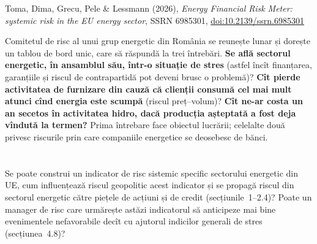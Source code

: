 
\renewcommand{\emqacase}{\T{Research case 4 (Lecture 4)}{Studiul de caz 4 (cursul 4)}}

%
          { Toma, Dima, Grecu, Pele \& Lessmann (2026), \emph{Energy Financial Risk Meter: systemic risk in the EU energy sector},
           SSRN 6985301, \href{https://doi.org/10.2139/ssrn.6985301}{doi:10.2139/ssrn.6985301}}

\begin{scenario}
%
{Comitetul de risc al unui grup energetic din România se reunește lunar și dorește un tablou de bord unic, care să răspundă la trei întrebări.
\textbf{Se află sectorul energetic, în ansamblul său, într-o situație de stres} (astfel încît finanțarea, garanțiile și riscul de contrapartidă pot deveni brusc o problemă)?
\textbf{Cît pierde activitatea de furnizare din cauză că clienții consumă cel mai mult atunci cînd energia este scumpă} (riscul preț--volum)?
\textbf{Cît ne-ar costa un an secetos în activitatea hidro, dacă producția așteptată a fost deja vîndută la termen?}
Prima întrebare face obiectul lucrării; celelalte două privesc riscurile prin care companiile energetice se deosebesc de bănci.}
\end{scenario}

\section{}
\textbf{} %
{Se poate construi un indicator de risc sistemic specific sectorului energetic din UE, cum influențează riscul geopolitic acest indicator și se propagă riscul din sectorul energetic către piețele de acțiuni și de credit (secțiunile~1--2.4)?
Poate un manager de risc care urmărește astăzi indicatorul să anticipeze mai bine evenimentele nefavorabile decît cu ajutorul indicilor generali de stres (secțiunea~4.8)?}

